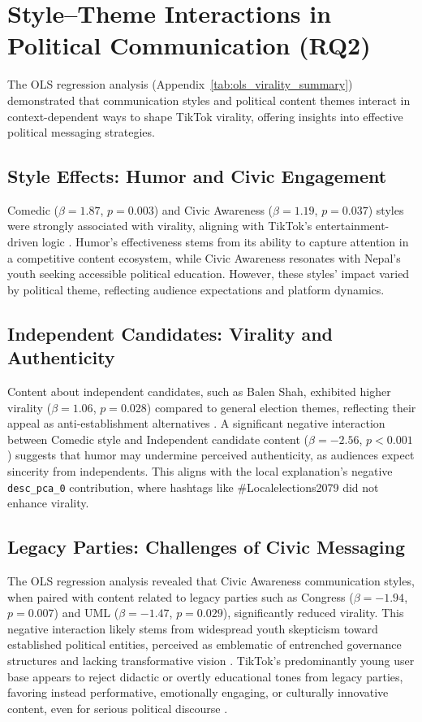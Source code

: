 \documentclass[12pt,a4paper]{report}
\begin{document}
\section{Style--Theme Interactions in Political Communication (RQ2)}
\label{sec:rq2_discussion}

The OLS regression analysis (Appendix~\ref{tab:ols_virality_summary}) demonstrated that communication styles and political content themes interact in context-dependent ways to shape TikTok virality, offering insights into effective political messaging strategies.

\subsection{Style Effects: Humor and Civic Engagement}
Comedic (\(\beta = 1.87\), \(p = 0.003\)) and Civic Awareness (\(\beta = 1.19\), \(p = 0.037\)) styles were strongly associated with virality, aligning with TikTok’s entertainment-driven logic \parencite{PeñaFernández2022}. Humor’s effectiveness stems from its ability to capture attention in a competitive content ecosystem, while Civic Awareness resonates with Nepal’s youth seeking accessible political education. However, these styles’ impact varied by political theme, reflecting audience expectations and platform dynamics.

\subsection{Independent Candidates: Virality and Authenticity}
Content about independent candidates, such as Balen Shah, exhibited higher virality (\(\beta = 1.06\), \(p = 0.028\)) compared to general election themes, reflecting their appeal as anti-establishment alternatives \parencite{NepalNews2024}. A significant negative interaction between Comedic style and Independent candidate content (\(\beta = -2.56\), \(p < 0.001\)) suggests that humor may undermine perceived authenticity, as audiences expect sincerity from independents. This aligns with the local explanation’s negative \texttt{desc\_pca\_0} contribution, where hashtags like \#Localelections2079 did not enhance virality.

\subsection{Legacy Parties: Challenges of Civic Messaging}
The OLS regression analysis revealed that Civic Awareness communication styles, when paired with content related to legacy parties such as Congress (\(\beta = -1.94\), \(p = 0.007\)) and UML (\(\beta = -1.47\), \(p = 0.029\)), significantly reduced virality. This negative interaction likely stems from widespread youth skepticism toward established political entities, perceived as emblematic of entrenched governance structures and lacking transformative vision \parencite{Onlinekhabar2022}. TikTok’s predominantly young user base appears to reject didactic or overtly educational tones from legacy parties, favoring instead performative, emotionally engaging, or culturally innovative content, even for serious political discourse \parencite{KarimiFox2023}.
\end{document}
